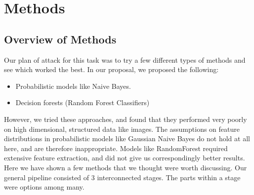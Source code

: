 \section{Methods}

\subsection{Overview of Methods}
Our plan of attack for this task was to try a few different types of methods and see which worked the best. In our proposal, we proposed the following:
\begin{itemize}
	\item Probabilistic models like Naive Bayes.
	\item Decision forests (Random Forest Classifiers)
\end{itemize}

However, we tried these approaches, and found that they performed very poorly on high dimensional, structured data like images. The assumptions on feature distributions in probabilistic models like Gaussian Naive Bayes do not hold at all here, and are therefore inappropriate. Models like RandomForest required extensive feature extraction, and did not give us correspondingly better results. Here we have shown a few methods that we thought were worth discussing. Our general pipeline consisted of 3 interconnected stages. The parts within a stage were options among many.
 

